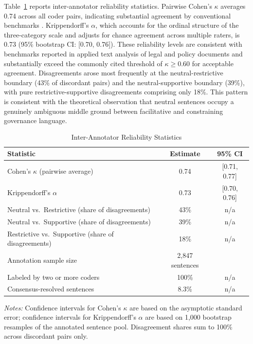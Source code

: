 \documentclass[12pt]{article}
\begin{document}
Table~\ref{tab:iaa} reports inter-annotator reliability statistics.  Pairwise
Cohen's $\kappa$ averages 0.74 across all coder pairs, indicating substantial agreement
by conventional benchmarks \citep[pp.~412--415]{Landis1977}.  Krippendorff's $\alpha$,
which accounts for the ordinal structure of the three-category scale and adjusts for
chance agreement across multiple raters, is 0.73 (95\% bootstrap CI: [0.70, 0.76]).
These reliability levels are consistent with benchmarks reported in applied text
analysis of legal and policy documents \citep{Chalkidis2019} and substantially exceed
the commonly cited threshold of $\kappa \geq 0.60$ for acceptable agreement.
Disagreements arose most frequently at the neutral-restrictive boundary (43\% of
discordant pairs) and the neutral-supportive boundary (39\%), with pure
restrictive-supportive disagreements comprising only 18\%.  This pattern is consistent
with the theoretical observation that neutral sentences occupy a genuinely ambiguous
middle ground between facilitative and constraining governance language.

\begin{table}[H]
\centering
\caption{Inter-Annotator Reliability Statistics}
\label{tab:iaa}
\begin{threeparttable}
\small
\begin{tabular}{lcc}
\toprule
\textbf{Statistic} & \textbf{Estimate} & \textbf{95\% CI} \\
\midrule
Cohen's $\kappa$ (pairwise average) & 0.74 & [0.71, 0.77] \\
Krippendorff's $\alpha$             & 0.73 & [0.70, 0.76] \\
\addlinespace
Neutral vs.\ Restrictive (share of disagreements) & 43\% & \multicolumn{1}{c}{n/a} \\
Neutral vs.\ Supportive (share of disagreements)  & 39\% & \multicolumn{1}{c}{n/a} \\
Restrictive vs.\ Supportive (share of disagreements) & 18\% & \multicolumn{1}{c}{n/a} \\
\addlinespace
Annotation sample size          & 2,847 sentences & \phantom{x} \\
Labeled by two or more coders   & 100\%           & \multicolumn{1}{c}{n/a} \\
Consensus-resolved sentences    & 8.3\%           & \multicolumn{1}{c}{n/a} \\
\bottomrule
\end{tabular}
\begin{tablenotes}
\small
\item \textit{Notes:} Confidence intervals for Cohen's $\kappa$ are based on the
  asymptotic standard error; confidence intervals for Krippendorff's $\alpha$ are
  based on 1,000 bootstrap resamples of the annotated sentence pool.  Disagreement
  shares sum to 100\% across discordant pairs only.
\end{tablenotes}
\end{threeparttable}
\end{table}
\end{document}
